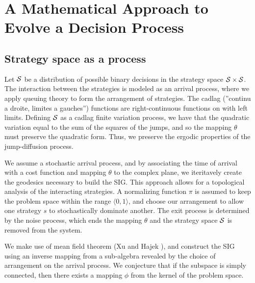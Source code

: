 \section{A Mathematical Approach to Evolve a Decision Process}
\label{sec:Approach}

\subsection{Strategy space as a process}

Let $\mathcal{S}$ be a distribution of possible binary decisions in the strategy space
$\mathcal{S} \times \mathcal{S}$. The interaction between the strategies is modeled as an
arrival process, where we apply queuing theory to form the arrangement of
strategies. The cadlag (”continu a droite, limites a gauches”) functions are
right-continuous functions on with left limits. Defining $\mathcal{S}$ as a cadlag
finite variation process, we have that the quadratic variation equal to the sum
of the squares of the jumps, and so the mapping $\theta$ must preserve the
quadratic form. Thus, we preserve the ergodic properties of the jump-diffusion
process.


We assume a stochastic arrival process, and by associating the time of
arrival with a cost function and mapping $\theta$ to the complex plane, we
iteritavely create the geodesics necessary to build the SIG. This approach
allows for a topological analysis of the interacting strategies. A normalizing
function $\pi$ is assumed to keep the problem space within the range $\langle 0,
1 \rangle$, and choose our arrangement to allow one strategy $s$ to
stochastically dominate another. The exit process is determined by the noise
process, which ends the mapping $\theta$ and the strategy space $\mathcal{S}$ is
removed from the system.

We make use of mean field theorem (Xu and
Hajek ), and construct the SIG using an inverse mapping
from a sub-algebra revealed by the choice of arrangement on the arrival process.
We conjecture that if the subspace is simply connected, then there exists a
mapping $\phi$ from the kernel of the problem space.

